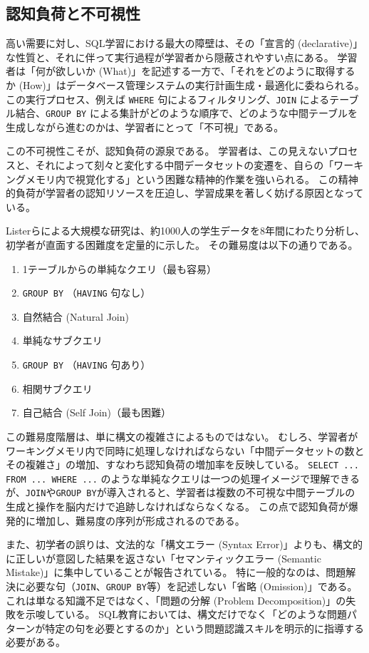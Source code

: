 \documentclass[uplatex,a4paper,12pt]{ujreport}
\begin{document}
\subsection{認知負荷と不可視性}
高い需要に対し、SQL学習における最大の障壁は、その「宣言的 (declarative)」な性質と、それに伴って実行過程が学習者から隠蔽されやすい点にある。
学習者は「何が欲しいか (What)」を記述する一方で、「それをどのように取得するか (How)」はデータベース管理システムの実行計画生成・最適化に委ねられる。
この実行プロセス、例えば \texttt{WHERE} 句によるフィルタリング、\texttt{JOIN} によるテーブル結合、\texttt{GROUP BY} による集計がどのような順序で、どのような中間テーブルを生成しながら進むのかは、学習者にとって「不可視」である。
\par
この不可視性こそが、認知負荷の源泉である。
学習者は、この見えないプロセスと、それによって刻々と変化する中間データセットの変遷を、自らの「ワーキングメモリ内で視覚化する」という困難な精神的作業を強いられる。
この精神的負荷が学習者の認知リソースを圧迫し、学習成果を著しく妨げる原因となっている。
\par
Listerらによる大規模な研究\cite{seven-different-types-of-sql-queries}は、約1000人の学生データを8年間にわたり分析し、初学者が直面する困難度を定量的に示した。
その難易度は以下の通りである。
\begin{enumerate}
  \item 1テーブルからの単純なクエリ（最も容易）
  \item \texttt{GROUP BY} （\texttt{HAVING} 句なし）
  \item 自然結合 (Natural Join)
  \item 単純なサブクエリ
  \item \texttt{GROUP BY} （\texttt{HAVING} 句あり）
  \item 相関サブクエリ
  \item 自己結合 (Self Join)（最も困難）
\end{enumerate}
この難易度階層は、単に構文の複雑さによるものではない。
むしろ、学習者がワーキングメモリ内で同時に処理しなければならない「中間データセットの数とその複雑さ」の増加、すなわち認知負荷の増加率を反映している。
\texttt{SELECT ... FROM ... WHERE ...} のような単純なクエリは一つの処理イメージで理解できるが、\texttt{JOIN}や\texttt{GROUP BY}が導入されると、学習者は複数の不可視な中間テーブルの生成と操作を脳内だけで追跡しなければならなくなる。
この点で認知負荷が爆発的に増加し、難易度の序列が形成されるのである。
\par
また、初学者の誤りは、文法的な「構文エラー (Syntax Error)」よりも、構文的に正しいが意図した結果を返さない「セマンティックエラー (Semantic Mistake)」に集中していることが報告されている\cite{semantic-mistakes}。
特に一般的なのは、問題解決に必要な句（\texttt{JOIN}、\texttt{GROUP BY}等）を記述しない「省略 (Omission)」である。
これは単なる知識不足ではなく、「問題の分解 (Problem Decomposition)」の失敗を示唆している。
SQL教育においては、構文だけでなく「どのような問題パターンが特定の句を必要とするのか」という問題認識スキルを明示的に指導する必要がある。
\end{document}
